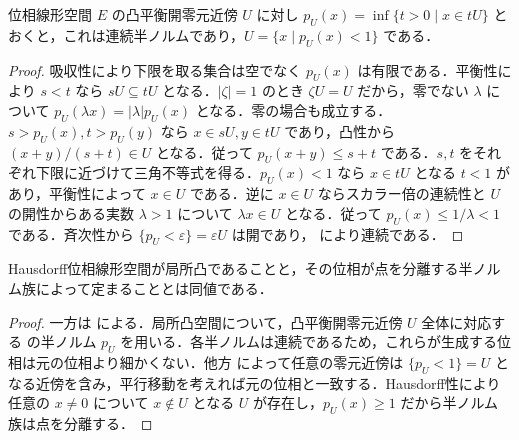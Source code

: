 \begin{prop}[Minkowski汎函数]
位相線形空間 $E$ の凸平衡開零元近傍 $U$ に対し $p_U(x)=\inf\{t>0\mid x\in tU\}$ とおくと，これは連続半ノルムであり，$U=\{x\mid p_U(x)<1\}$ である．
\end{prop}
\begin{proof}
吸収性により下限を取る集合は空でなく $p_U(x)$ は有限である．平衡性により $s<t$ なら $sU\subseteq tU$ となる．$|\zeta|=1$ のとき $\zeta U=U$ だから，零でない $\lambda$ について $p_U(\lambda x)=|\lambda|p_U(x)$ となる．零の場合も成立する．$s>p_U(x),t>p_U(y)$ なら $x\in sU,y\in tU$ であり，凸性から $(x+y)/(s+t)\in U$ となる．従って $p_U(x+y)\leq s+t$ である．$s,t$ をそれぞれ下限に近づけて三角不等式を得る．$p_U(x)<1$ なら $x\in tU$ となる $t<1$ があり，平衡性によって $x\in U$ である．逆に $x\in U$ ならスカラー倍の連続性と $U$ の開性からある実数 $\lambda>1$ について $\lambda x\in U$ となる．従って $p_U(x)\leq1/\lambda<1$ である．斉次性から $\{p_U<\varepsilon\}=\varepsilon U$ は開であり， により連続である．
\end{proof}
\begin{prop}[局所凸位相の半ノルムによる特徴づけ]
Hausdorff位相線形空間が局所凸であることと，その位相が点を分離する半ノルム族によって定まることとは同値である．
\end{prop}
\begin{proof}
一方は  による．局所凸空間について，凸平衡開零元近傍 $U$ 全体に対応する  の半ノルム $p_U$ を用いる．各半ノルムは連続であるため，これらが生成する位相は元の位相より細かくない．他方  によって任意の零元近傍は $\{p_U<1\}=U$ となる近傍を含み，平行移動を考えれば元の位相と一致する．Hausdorff性により任意の $x\ne0$ について $x\notin U$ となる $U$ が存在し，$p_U(x)\geq1$ だから半ノルム族は点を分離する．
\end{proof}
